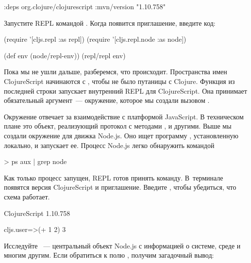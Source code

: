 \begin{english}
  \begin{clojure}
{:deps
 {org.clojure/clojurescript {:mvn/version "1.10.758"}}}
  \end{clojure}
\end{english}

Запустите REPL командой . Когда появится приглашение, введите код:

\begin{english}
  \begin{clojure}
(require '[cljs.repl :as repl])
(require '[cljs.repl.node :as node])

(def env (node/repl-env))
(repl/repl env)
  \end{clojure}
\end{english}

Пока мы не ушли дальше, разберемся, что происходит. Пространства имен ClojureScript начинаются с , чтобы не было путаницы с Clojure. Функция  из последней строки запускает внутренний REPL для ClojureScript. Она принимает обязательный аргумент~--- окружение, которое мы создали вызовом .

Окружение отвечает за взаимодействие с платформой JavaScript. В техническом плане это объект, реализующий протокол  с методами ,  и другими. Выше мы создали окружение для движка Node.js. Оно ищет программу , установленную локально, и запускает ее. Процесс Node.js легко обнаружить командой

\begin{english}
  \begin{bash}
> ps aux | grep node
  \end{bash}
\end{english}

Как только процесс запущен, REPL готов принять команду. В~терминале появятся версия ClojureScript и приглашение. Введите , чтобы убедиться, что схема работает.

\begin{english}
  \begin{text}
ClojureScript 1.10.758

cljs.user=>(+ 1 2)
3
  \end{text}
\end{english}

Исследуйте ~--- центральный объект Node.js с информацией о системе, среде и многим другим. Если обратиться к полю , получим загадочный вывод:

